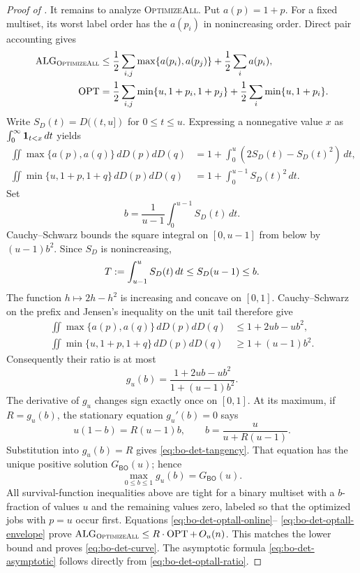\begin{proof}[Proof of ]
It remains to analyze \textsc{OptimizeAll}.  Put $a(p)=1+p$.  For a fixed
multiset, its worst label order has the
$a(p_i)$ in nonincreasing order.  Direct pair accounting gives
\begin{align}
 \operatorname{ALG}_{\textsc{OptimizeAll}}
 &\le \frac12\sum_{i,j}\max\{a(p_i),a(p_j)\}
      +\frac12\sum_i a(p_i),
 \label{eq:bo-det-optall-online}\\
 \operatorname{OPT}
 &=\frac12\sum_{i,j}\min\{u,1+p_i,1+p_j\}
      +\frac12\sum_i\min\{u,1+p_i\}.
 \label{eq:bo-det-optall-offline}
\end{align}
Write $S_D(t)=D((t,u])$ for $0\le t\le u$.  Expressing a nonnegative value
$x$ as $\int_0^\infty\mathbf{1}_{t<x}\,dt$ yields
\begin{align}
 \iint\max\{a(p),a(q)\}\,dD(p)dD(q)
 &=1+\int_0^u(2S_D(t)-S_D(t)^2)\,dt,
 \label{eq:bo-det-optall-layer-online}\\
 \iint\min\{u,1+p,1+q\}\,dD(p)dD(q)
 &=1+\int_0^{u-1}S_D(t)^2\,dt.
 \label{eq:bo-det-optall-layer-offline}
\end{align}
Set
\begin{equation}
 b=\frac1{u-1}\int_0^{u-1}S_D(t)\,dt.
\end{equation}
Cauchy--Schwarz bounds the square integral on $[0,u-1]$ from below by
$(u-1)b^2$.  Since $S_D$ is nonincreasing,
\begin{equation}
 T\mathrel{:=}\int_{u-1}^uS_D(t)\,dt\le S_D(u-1)\le b.
\end{equation}
The function $h\mapsto2h-h^2$ is increasing and concave on $[0,1]$.
Cauchy--Schwarz on the prefix and Jensen's inequality on the unit tail
therefore give
\begin{align}
 \iint\max\{a(p),a(q)\}\,dD(p)dD(q)
 &\le1+2ub-ub^2,\\
 \iint\min\{u,1+p,1+q\}\,dD(p)dD(q)
 &\ge1+(u-1)b^2.
\end{align}
Consequently their ratio is at most
\begin{equation}
 g_u(b)=\frac{1+2ub-ub^2}{1+(u-1)b^2}.
 \label{eq:bo-det-optall-envelope}
\end{equation}
The derivative of $g_u$ changes sign exactly once on $[0,1]$.  At its
maximum, if $R=g_u(b)$, the stationary equation
$g_u'(b)=0$ says
\begin{equation}
 u(1-b)=R(u-1)b,
 \qquad
 b=\frac{u}{u+R(u-1)}.
\end{equation}
Substitution into $g_u(b)=R$ gives
\eqref{eq:bo-det-tangency}.  That equation has the unique positive solution
$G_{\mathsf{BO}}(u)$; hence
\begin{equation}
 \max_{0\le b\le1}g_u(b)=G_{\mathsf{BO}}(u).
\end{equation}
All survival-function inequalities above are tight for a binary multiset
with a $b$-fraction of values $u$ and the remaining values zero, labeled so
that the optimized jobs with $p=u$ occur first.
Equations \eqref{eq:bo-det-optall-online}--%
\eqref{eq:bo-det-optall-envelope} prove
$\operatorname{ALG}_{\textsc{OptimizeAll}}\le R\cdot\operatorname{OPT}+\,O_u(n)$.
This matches the lower bound and proves \eqref{eq:bo-det-curve}.
The asymptotic formula \eqref{eq:bo-det-asymptotic} follows directly from
\eqref{eq:bo-det-optall-ratio}.
\end{proof}

